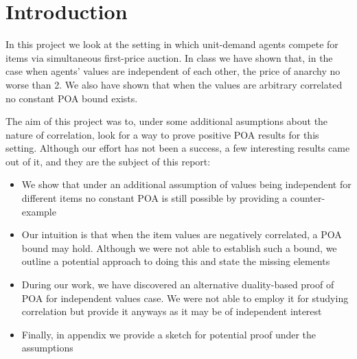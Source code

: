 \section{Introduction}

In this project we look at the setting in which unit-demand agents compete for items  via simultaneous first-price auction. In class we have shown that, in the case when agents' values are independent of each other, the price of anarchy no worse than 2. We also have shown that when the values are arbitrary correlated no constant POA bound exists.

The aim of this project was to, under some additional asumptions about the nature of correlation, look for a way to prove positive POA results for this setting. Although our effort has not been a success, a few interesting results came out of it, and they are the subject of this report:

\begin{itemize}
\item We show that under an additional assumption of values being independent for different items no constant POA is still possible by providing a counter-example
\item Our intuition is that when the item values are negatively correlated, a POA bound may hold. Although we were not able to establish such a bound, we outline a potential approach to doing this and state the missing elements
\item During our work, we have discovered an alternative duality-based proof of POA for independent values case. We were not able to employ it for studying correlation but provide it anyways as it may be of independent interest
\item Finally, in appendix we provide a sketch for potential proof under the assumptions 
\end{itemize}




